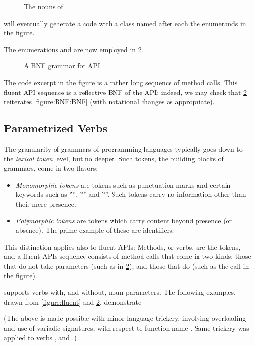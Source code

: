 \begin{figure}[htb]
  \caption{The nouns of \Fajita}
  \label{figure:Nouns}
\end{figure}
  \Fajita will eventually generate a code with
  a class named after each the enumerands in the figure.

The enumerations  and 
  are now employed in \cref{figure:BNF:fluent}.

\begin{figure}[htb]
  \caption{A BNF grammar for \Fajita API}
  \label{figure:BNF:fluent}
\end{figure}

The code excerpt in the figure is a rather long
sequence of method calls.
This fluent API sequence is a reflective BNF
of the \Fajita API;
indeed, we may check that \cref{figure:BNF:fluent} reiterates \cref{figure:BNF:BNF}
(with notational changes as appropriate).

\subsection{Parametrized Verbs}
The granularity of grammars of programming languages typically goes down to the \emph{lexical token} level,
but no deeper.
Such tokens, the building blocks of grammars, come in two flavors:
\begin{itemize}
  \item \emph{Monomorphic tokens} are tokens such as punctuation marks and
        certain keywords such as ‟”, ‟” and ‟”.
        Such tokens carry no information other than their mere presence.
  \item \emph{Polymorphic tokens} are tokens which carry content beyond
        presence (or absence). The prime example of these are identifiers.
\end{itemize}

This distinction applies also to fluent APIs:
Methods, or verbs, are the tokens, and a fluent APIs sequence consists of
method calls that come in two kinds: those that do not take parameters (such as  in \cref{figure:BNF:fluent}),
and those that do (such as the call  in the figure).

\Fajita supports verbs with, and without, noun parameters.
The following examples, drawn from \cref{figure:fluent} and \cref{figure:BNF:fluent},
demonstrate,
\begin{quote}
  \parbox[c]{30ex}{}
\end{quote}
(The above is made possible with minor \Java language trickery,
  involving overloading and use of variadic signatures,
  with respect to function name .
Same trickery was applied to verbs , and .)
